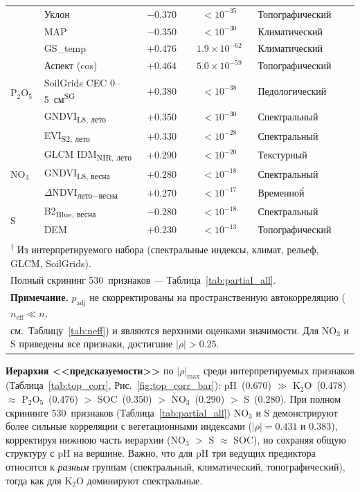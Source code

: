 \begin{table}[H]
\begin{tabular}{llccl}
  & Уклон                   & $-0.370$ & $< 10^{-35}$ & Топографический \\
  & MAP                     & $-0.350$ & $< 10^{-30}$ & Климатический \\
\midrule
\multirow{5}{*}{P$_2$O$_5$}
  & GS\_temp                & $+0.476$ & $1.9 \times 10^{-62}$ & Климатический \\
  & Аспект (cos)            & $+0.464$ & $5.0 \times 10^{-59}$ & Топографический \\
  & SoilGrids CEC 0--5~см\textsuperscript{SG}   & $+0.380$ & $< 10^{-38}$ & Педологический \\
  & GNDVI\textsubscript{L8, лето}  & $+0.350$ & $< 10^{-30}$ & Спектральный \\
  & EVI\textsubscript{S2, лето}    & $+0.330$ & $< 10^{-28}$ & Спектральный \\
\midrule
\multirow{3}{*}{NO$_3$}
  & GLCM IDM\textsubscript{NIR, лето}  & $+0.290$ & $< 10^{-20}$ & Текстурный \\
  & GNDVI\textsubscript{L8, весна} & $+0.280$ & $< 10^{-18}$ & Спектральный \\
  & $\Delta$NDVI\textsubscript{лето$-$весна} & $+0.270$ & $< 10^{-17}$ & Временно\'{й} \\
\midrule
\multirow{2}{*}{S}
  & B2\textsubscript{Blue, весна}  & $-0.280$ & $< 10^{-18}$ & Спектральный \\
  & DEM                     & $+0.230$ & $< 10^{-13}$ & Топографический \\
\bottomrule
\multicolumn{5}{l}{\footnotesize \textsuperscript{$\dagger$} Из интерпретируемого набора (спектральные индексы, климат, рельеф, GLCM, SoilGrids).} \\
\multicolumn{5}{l}{\footnotesize \quad Полный скрининг 530~признаков --- Таблица~\ref{tab:partial_all}.} \\
\multicolumn{5}{l}{\footnotesize \quad \textbf{Примечание.} $p_{\text{adj}}$ не скорректированы на пространственную автокорреляцию ($n_{\text{eff}} \ll n$,} \\
\multicolumn{5}{l}{\footnotesize \quad см.~Таблицу~\ref{tab:neff}) и являются верхними оценками значимости. Для NO$_3$ и S приведены все признаки, достигшие $|\rho| > 0.25$.}
\end{tabular}
\end{table}

\textbf{Иерархия <<предсказуемости>>} по $|\rho|_{\max}$ среди интерпретируемых признаков (Таблица~\ref{tab:top_corr}, Рис.~\ref{fig:top_corr_bar}): pH~(0.670) $\gg$ K$_2$O~(0.478) $\approx$ P$_2$O$_5$~(0.476) $>$ SOC~(0.350) $>$ NO$_3$~(0.290) $>$ S~(0.280). При полном скрининге 530~признаков (Таблица~\ref{tab:partial_all}) NO$_3$ и S демонстрируют более сильные корреляции с вегетационными индексами ($|\rho| = 0.431$ и $0.383$), корректируя нижнюю часть иерархии (NO$_3$ $>$ S $\approx$ SOC), но сохраняя общую структуру с pH на вершине. Важно, что для pH три ведущих предиктора относятся к \emph{разным} группам (спектральный, климатический, топографический), тогда как для K$_2$O доминируют спектральные.

